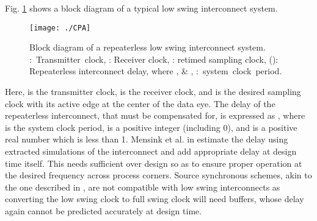 \documentclass[journal,twoside,letterpaper]{IEEEtran}
\begin{document}
Fig. \ref{fig:CPA} shows a block diagram of a typical low swing interconnect system.
\begin{figure}[!h]
\centering
\texttt{[image: ./CPA]}
\caption{Block diagram of a repeaterless low
swing interconnect system. \mbox{: Transmitter clock}, 
\mbox{}: 
Receiver clock, \mbox{}: retimed sampling clock, 
(): Repeaterless interconnect delay, where
\mbox{},
\mbox{} \& \mbox{}, 
\mbox{: system clock period.}}
\label{fig:CPA}
\end{figure}
Here,  is the transmitter clock,  is 
the receiver clock,
and  is the desired sampling clock with its active edge at the center of
the data eye. The delay of the repeaterless interconnect, that must be 
compensated for, is expressed as
, where  is the system clock period,  is a positive
 integer (including 0),
and  is a positive real number which is less than 1. 
Mensink et al. in \cite{Mensink-jssc-2010} estimate
the delay using extracted simulations of the interconnect and add
appropriate delay at design time itself. This needs sufficient over design
so as to ensure proper operation at the desired frequency across process
corners. Source synchronous schemes, akin
to the one described in \cite{vivekde-tcas-09}, are not compatible with low swing interconnects
as converting the low swing clock to full swing clock will need buffers, whose
delay again cannot be predicted accurately at design time. 
\end{document}
